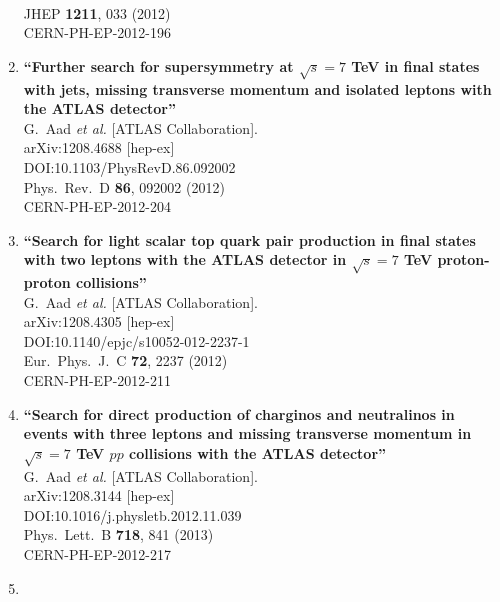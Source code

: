 \documentclass{article}
\begin{document}
\begin{enumerate}
  \\{}JHEP {\bf 1211}, 033 (2012)
  \\{}CERN-PH-EP-2012-196
\item%
{\bf ``Further search for supersymmetry at $\sqrt{s}=7$ TeV in final states with jets, missing transverse momentum and isolated leptons with the ATLAS detector''}
  \\{}G.~Aad {\it et al.} [ATLAS Collaboration].
  \\{}arXiv:1208.4688 [hep-ex]
  \\{}DOI:10.1103/PhysRevD.86.092002
  \\{}Phys.\ Rev.\ D {\bf 86}, 092002 (2012)
  \\{}CERN-PH-EP-2012-204
\item%
{\bf ``Search for light scalar top quark pair production in final states with two leptons with the ATLAS detector in $\sqrt{s}=7$ TeV proton-proton collisions''}
  \\{}G.~Aad {\it et al.} [ATLAS Collaboration].
  \\{}arXiv:1208.4305 [hep-ex]
  \\{}DOI:10.1140/epjc/s10052-012-2237-1
  \\{}Eur.\ Phys.\ J.\ C {\bf 72}, 2237 (2012)
  \\{}CERN-PH-EP-2012-211
\item%
{\bf ``Search for direct production of charginos and neutralinos in events with three leptons and missing transverse momentum in $\sqrt{s}=7$ TeV $pp$ collisions with the ATLAS detector''}
  \\{}G.~Aad {\it et al.} [ATLAS Collaboration].
  \\{}arXiv:1208.3144 [hep-ex]
  \\{}DOI:10.1016/j.physletb.2012.11.039
  \\{}Phys.\ Lett.\ B {\bf 718}, 841 (2013)
  \\{}CERN-PH-EP-2012-217
\item%

\end{enumerate}
\end{document}

